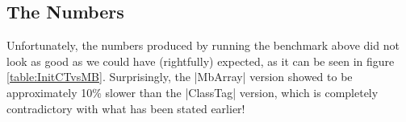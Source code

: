 \subsection{The Numbers}

Unfortunately, the numbers produced by running the benchmark above did not look as good as we could have (rightfully) expected, as it can be seen in figure \ref{table:InitCTvsMB}.
Surprisingly, the |MbArray| version showed to be approximately 10\% slower than the |ClassTag| version, which is completely contradictory with what has been stated earlier!



